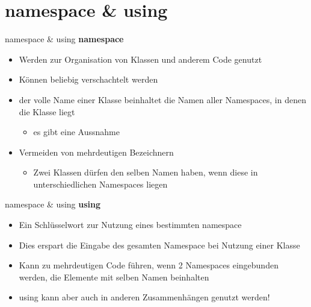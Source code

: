 \section{namespace \& using}
\begin{frame}{namespace \& using}
	\textbf{namespace}\\
	\begin{itemize}
		\item Werden zur Organisation von Klassen und anderem Code genutzt 
		\item Können beliebig verschachtelt werden
		\item der volle Name einer Klasse beinhaltet die Namen aller Namespaces, in denen die Klasse liegt
		\begin{itemize}
			\item es gibt eine Aussnahme
		\end{itemize}
		\item Vermeiden von mehrdeutigen Bezeichnern 
		\begin{itemize}
			\item Zwei Klassen dürfen den selben Namen haben, wenn diese in unterschiedlichen Namespaces liegen		
		\end{itemize}
	\end{itemize}	
	
\end{frame}

\begin{frame}{namespace \& using}
	\textbf{using}\\
	\begin{itemize}
		\item Ein Schlüsselwort zur Nutzung eines bestimmten \alert{namespace}
		\item Dies erspart die Eingabe des gesamten Namespace bei Nutzung einer Klasse
		\item Kann zu mehrdeutigen Code führen, wenn 2 Namespaces eingebunden werden, die Elemente mit selben Namen beinhalten
	\end{itemize}
	\begin{itemize}
		\item \alert{using} kann aber auch in anderen Zusammenhängen genutzt werden!
	\end{itemize}
\end{frame}

\begin{frame}	
	
\end{frame}

